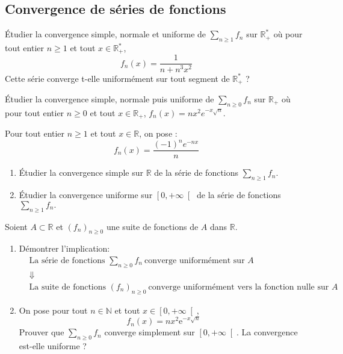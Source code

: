 \documentclass[a4paper,twoside,french,11pt]{VcCours}
\newcommand{\Sum}[2]{\sum_{#1}^{#2}}
\begin{document}
\medskip

\subsection{\large Convergence de séries de fonctions}

\medskip

\begin{Exercice}{} Étudier la convergence simple, normale et uniforme de $\Sum{n\geq 1}{} f_n$ sur $\mathbb{R}_+^*$ où pour tout entier $n \geq 1$ et tout $x \in \mathbb{R}_+^*$, 
$$ f_n(x) = \frac{1}{n+n^3x^2}$$
Cette série converge t-elle uniformément sur tout segment de $\mathbb{R}_+^*$ ?
\end{Exercice} 



\begin{Exercice}[$\bigstar$] Étudier la convergence simple, normale puis uniforme de $\Sum{n\geq 0}{} f_n$ sur $\mathbb{R}_+$ où pour tout entier $n \geq 0$ et tout $x \in \mathbb{R}_+$, $f_n(x) = nx^2e^{-x\sqrt{n}}.$
\end{Exercice}

\begin{Exercice}{} Pour tout entier $n \geq 1$ et tout $x \in \mathbb{R}$, on pose :
$$ f_n(x) = \dfrac{\left(-1\right)^{n}e^{-nx}}{n} $$

\begin{enumerate}
\item Étudier la convergence simple sur $\mathbb{R}$  de la série de fonctions $\Sum{n\geq 1}{} f_n.$
\item Étudier la convergence uniforme sur $\left[ 0,+\infty\right[ $  de la série de fonctions $\Sum{n\geq 1}{} f_n.$
\end{enumerate}
\end{Exercice}

 


\begin{Exercice}[$\bigstar$] Soient $A\subset \mathbb{R}$ et $\left( f_{n}\right)_{n \geq 0}$ une suite de fonctions de $A$ dans $\mathbb{R}$.

\begin{enumerate}
\item Démontrer l'implication:
	\begin{eqnarray*}
	&  \text{La série de fonctions }\Sum{n\geq 0}{} f_n\ \text{converge uniformément sur $A$}& \\
	&\Downarrow &\\
	&\text{La suite de fonctions\ }\left( f_{n}\right) _{n \geq 0}\ \text{converge uniformément vers la fonction nulle sur $A$}&
	\end{eqnarray*}
\item
On pose pour tout $n\in\mathbb{N}$ et tout $x\in\left[ 0,+\infty\right[ $, 
$$f_n(x)=nx^2\mathrm{e}^{-x\sqrt{n}}$$
Prouver que $\Sum{n\geq 0}{} f_n$ converge simplement sur $\left[ 0,+\infty\right[$. La convergence est-elle uniforme ?
\end{enumerate}
\end{Exercice}
\end{document}
